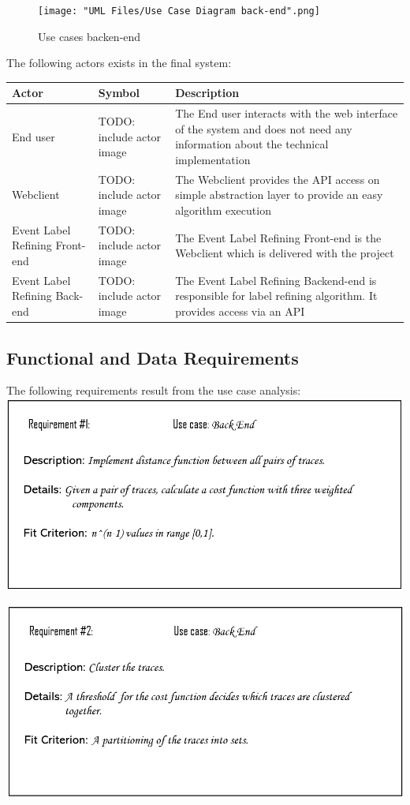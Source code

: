 \documentclass[notitlepage]{article}
\begin{document}
\begin{flushleft}
\begin{figure}[h!]
  \texttt{[image: "UML Files/Use Case Diagram back-end".png]}
  \caption{Use cases backen-end}
  \label{fig:back-end}
\end{figure}
\clearpage
The following actors exists in the final system:\\
\medskip
\begin{tabularx}{\textwidth}{|m{3cm}|m{3cm}|m{10cm}|}
	\hline
	\textbf{Actor} 
	&\textbf{Symbol}
	&\textbf{Description}\\
	\hline
	End user & {\color{red} TODO: include actor image} & The End user interacts with the web interface of the system and does not need any information about the technical implementation\\
	\hline
	Webclient & {\color{red} TODO: include actor image} & The Webclient provides the API access on simple abstraction layer to provide an easy algorithm execution\\
	\hline
	Event Label Refining Front-end & {\color{red} TODO: include actor image} & The Event Label Refining Front-end is the Webclient which is delivered with the project \\
	\hline
	Event Label Refining Back-end & {\color{red} TODO: include actor image} & The Event Label Refining Backend-end is responsible for label refining algorithm. It provides access via an API \\
	\hline
\end{tabularx}

\subsection{Functional and Data Requirements}
The following requirements result from the use case analysis:\\
\medskip
\includegraphics[scale=0.6]{Req1.png}

\includegraphics[scale=0.6]{Req2.png}


\end{flushleft}
\end{document}
